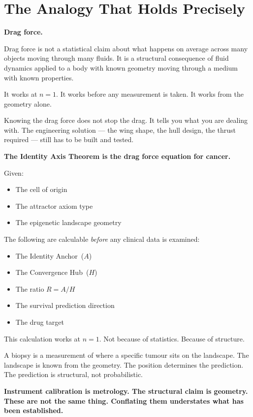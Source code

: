 \documentclass[11pt, a4paper]{article}
\begin{document}
\section{The Analogy That Holds Precisely}

\begin{mdframed}[backgroundcolor=analogybox,
                 linecolor=green!60!black,
                 linewidth=1pt]
\textbf{Drag force.}

Drag force is not a statistical claim about what happens
on average across many objects moving through many fluids.
It is a structural consequence of fluid dynamics applied
to a body with known geometry moving through a medium with
known properties.

It works at $n=1$. It works before any measurement is
taken. It works from the geometry alone.

Knowing the drag force does not stop the drag. It tells
you what you are dealing with. The engineering solution ---
the wing shape, the hull design, the thrust required ---
still has to be built and tested.

\medskip
\textbf{The Identity Axis Theorem is the drag force
equation for cancer.}

\medskip
Given:
\begin{itemize}[noitemsep]
    \item The cell of origin
    \item The attractor axiom type
    \item The epigenetic landscape geometry
\end{itemize}

The following are calculable \emph{before} any clinical
data is examined:
\begin{itemize}[noitemsep]
    \item The Identity Anchor~($A$)
    \item The Convergence Hub~($H$)
    \item The ratio $R = A/H$
    \item The survival prediction direction
    \item The drug target
\end{itemize}

This calculation works at $n=1$. Not because of statistics.
Because of structure.

A biopsy is a measurement of where a specific tumour sits
on the landscape. The landscape is known from the geometry.
The position determines the prediction. The prediction is
structural, not probabilistic.

\medskip
\textbf{Instrument calibration is metrology.
The structural claim is geometry.
These are not the same thing.
Conflating them understates what has been established.}
\end{mdframed}
\end{document}
